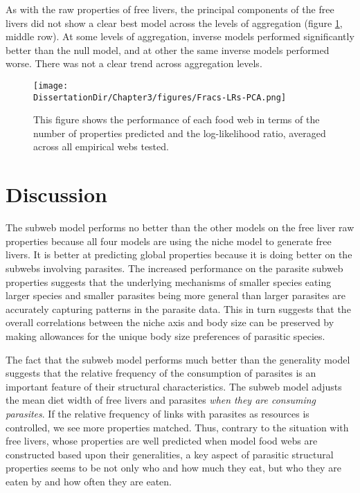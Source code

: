 \documentclass[/home/nkappler/Research/Dissertation/
 dissertation.tex]{subfiles}
\begin{document}
\begin{bibunit}
As with the raw properties of free livers, the principal components of the free
livers did not show a clear best model across the levels of aggregation (figure
\ref{fig:NMErrorsAggPCA}, middle row). At some levels of aggregation, inverse
models performed significantly better than the null model, and at other the
same inverse models performed worse. There was not a clear trend across
aggregation levels.

 \begin{figure}
     \centering
     \texttt{[image: \\DissertationDir/Chapter3/figures/Fracs-LRs-PCA.png]}
     \caption[Performance of niche models on agglomerated webs principal
     components]{This figure shows the performance of each food web in terms of
         the number of properties predicted and the log-likelihood ratio,
         averaged across all empirical webs tested.
 \label{fig:NMErrorsAggPCA}}
 \end{figure}

 
 \section{Discussion}

The subweb model performs no better than the other models on the free liver
raw properties because all four models are using the niche model to
generate free livers. It is better at predicting global properties because it
is doing better on the subwebs involving parasites. The increased performance
on the parasite subweb properties suggests that the underlying mechanisms of
smaller species eating larger species and smaller parasites being more general
than larger parasites are accurately capturing patterns in the parasite data.
 This in turn suggests that
the overall correlations between the niche axis and body size can be preserved
by making allowances for the unique body size preferences of parasitic species. 

The fact that the subweb model performs much better than the generality
model suggests that the relative frequency of the consumption of parasites is
an important feature of their structural characteristics. The subweb model
adjusts the mean diet width of free livers and parasites \textit{when they are
consuming parasites}. If the relative frequency of links with parasites as
resources is controlled, we see more properties matched. Thus, contrary to the
situation with free livers, whose properties are well predicted when model food
webs are constructed based upon their generalities, a key aspect of parasitic
structural properties seems to be not only who and how much they eat, but who
they are eaten by and how often they are eaten.


\end{bibunit}
\end{document}
